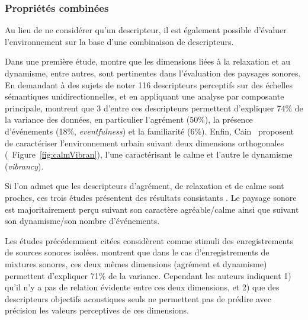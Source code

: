 \subsubsection{Propriétés combinées}

Au lieu de ne considérer qu'un descripteur, il est également possible d'évaluer l'environnement sur la base d'une combinaison de descripteurs.

Dans une première étude, \citep{kang2006urban} montre que les dimensions liées à la relaxation et au dynamisme, entre autres, sont pertinentes dans l'évaluation des paysages sonores. En demandant à des sujets de noter 116 descripteurs perceptifs sur des échelles sémantiques unidirectionnelles, et en appliquant une analyse par composante principale, \citep{axelsson2010principal} montrent que 3 d'entre ces descripteurs permettent d'expliquer 74\% de la variance des données, en particulier l'agrément (50\%), la présence d'événements (18\%, \emph{eventfulness})  et la familiarité (6\%). Enfin,  Cain~\al \citep{cain2013development} proposent de caractériser l'environnement urbain suivant deux dimensions orthogonales (\cf~Figure~\ref{fig:calmVibran}), l'une caractérisant le calme et l'autre le dynamisme (\emph{vibrancy}).

Si l'on admet que les descripteurs d'agrément, de relaxation et de calme sont proches, ces trois études présentent des résultats consistants \citep{davies2013perception}. Le paysage sonore est majoritairement perçu suivant son caractère agréable/calme ainsi que suivant son dynamisme/son nombre d'événements.
 
Les études précédemment citées considèrent comme stimuli des enregistrements de sources sonores isolées. \citep{hall2013exploratory} montrent que dans le cas d'enregistrements de mixtures sonores, ces deux mêmes dimensions (agrément et dynamisme) permettent d'expliquer 71\% de la variance. Cependant les auteurs indiquent 1) qu'il n'y a pas de relation évidente entre ces deux dimensions, et 2) que des descripteurs objectifs acoustiques seuls ne permettent pas de prédire avec précision les valeurs perceptives de ces dimensions.
 
